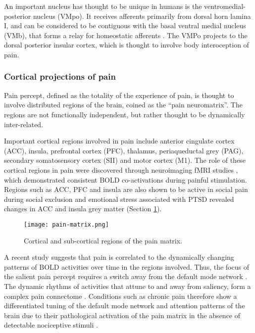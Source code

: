 An important nucleus has thought to be unique in humans is the ventromedial-posterior nucleus (VMpo)\cite{Willis2002,Craig2014}. It receives afferents primarily from dorsal horn lamina I, and can be considered to be contiguous with the basal ventral medial nucleus (VMb), that forms a relay for homeostatic afferents \cite{Craig2003}. The VMPo projects to the dorsal posterior insular cortex, which is thought to involve body interoception of pain.

\subsubsection{Cortical projections of pain}\label{section:neuromatrix}

Pain percept, defined as the totality of the experience of pain, is thought to involve distributed regions of the brain, coined as the “pain neuromatrix”\cite{Melzack1999a}. The regions are not functionally independent, but rather thought to be dynamically inter-related. 

 Important cortical regions involved in pain include anterior cingulate cortex (ACC), insula, prefrontal cortex (PFC), thalamus, periaqueductal grey (PAG), secondary somatosensory cortex (SII) and motor cortex (M1). The role of these cortical regions in pain were discovered through neuroimaging fMRI studies \cite{Apkarian2013c,Wager2013,Davis2012a}, which demonstrated consistent BOLD co-activations during painful stimulation.
Regions such as ACC, PFC and insula are also shown to be active in social pain during social exclusion and emotional stress associated with PTSD revealed changes in ACC and insula grey matter (Section \ref{fig:pain-matrix}).

 \begin{figure}[ht]
 \texttt{[image: pain-matrix.png]}
 \centering
 \caption{Cortical and sub-cortical regions of the pain matrix.} 
 \label{fig:pain-matrix}
 \end{figure}
 
A recent study suggests that pain is correlated to the dynamically changing patterns of BOLD activities over time in the regions involved. Thus, the focus of the salient pain percept requires a switch away from the default mode network \cite{Kucyi2013}. The dynamic rhythms of activities that attune to and away from saliency, form a complex pain connectome \cite{Kucyi2015}. Conditions such as chronic pain therefore show a differentiated tuning of the default mode network and attention patterns of the brain due to their pathological activation of the pain matrix in the absence of detectable nociceptive stimuli \cite{Baliki2008,Legrain2009}.

